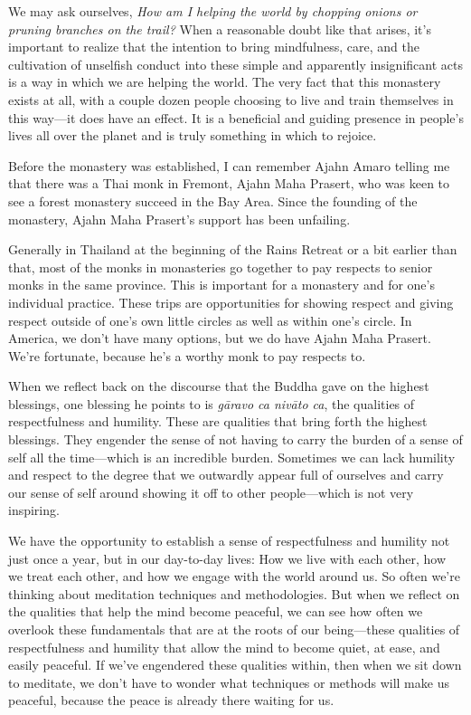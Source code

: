 We may ask ourselves, \emph{How am I helping the world by chopping 
onions or pruning branches on the trail?} When a reasonable doubt like 
that arises, it's important to realize that the intention to bring 
mindfulness, care, and the cultivation of unselfish conduct into these 
simple and apparently insignificant acts is a way in which we are 
helping the world. The very fact that this monastery exists at all, 
with a couple dozen people choosing to live and train themselves in 
this way---it does have an effect. It is a beneficial and guiding 
presence in people's lives all over the planet and is truly something 
in which to rejoice.


Before the monastery was established, I can remember Ajahn Amaro 
telling me that there was a Thai monk in Fremont, Ajahn Maha Prasert, 
who was keen to see a forest monastery succeed in the Bay Area. Since 
the founding of the monastery, Ajahn Maha Prasert's support has been 
unfailing.

Generally in Thailand at the beginning of the Rains Retreat or a bit 
earlier than that, most of the monks in monasteries go together to pay 
respects to senior monks in the same province. This is important for a 
monastery and for one's individual practice. These trips are 
opportunities for showing respect and giving respect outside of one's 
own little circles as well as within one's circle. In America, we don't 
have many options, but we do have Ajahn Maha Prasert. We're fortunate, 
because he's a worthy monk to pay respects to.

When we reflect back on the discourse that the Buddha gave on the 
highest blessings, one blessing he points to is \emph{gāravo ca 
nivāto ca}, the qualities of respectfulness and humility. These are 
qualities that bring forth the highest blessings. They engender the 
sense of not having to carry the burden of a sense of self all the 
time---which is an incredible burden. Sometimes we can lack humility 
and respect to the degree that we outwardly appear full of ourselves 
and carry our sense of self around showing it off to other 
people---which is not very inspiring.

We have the opportunity to establish a sense of respectfulness and 
humility not just once a year, but in our day-to-day lives: How we live 
with each other, how we treat each other, and how we engage with the 
world around us. So often we're thinking about meditation techniques 
and methodologies. But when we reflect on the qualities that help the 
mind become peaceful, we can see how often we overlook these 
fundamentals that are at the roots of our being---these qualities of 
respectfulness and humility that allow the mind to become quiet, at 
ease, and easily peaceful. If we've engendered these qualities within, 
then when we sit down to meditate, we don't have to wonder what 
techniques or methods will make us peaceful, because the peace is 
already there waiting for us.

